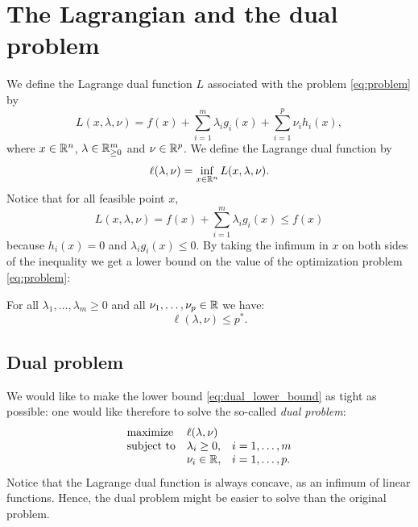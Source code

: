 \documentclass[11pt,nocut]{article}
\begin{document}
\section{The Lagrangian and the dual problem}

We define the Lagrange dual function $L$ associated with the problem \eqref{eq:problem} by
\begin{equation}
	L(x,\lambda,\nu) = 
	f(x) + \sum_{i=1}^m \lambda_i g_i(x) + \sum_{i=1}^p \nu_i h_i(x),
\end{equation}
where $x \in \mathbb{R}^n$, $\lambda \in \mathbb{R}_{\geq 0}^m$ and $\nu \in \mathbb{R}^p$. We define the Lagrange dual function by
$$
\ell(\lambda,\nu) = \inf_{x \in \mathbb{R}^n} L(x,\lambda,\nu).
$$
Notice that for all feasible point $x$,
$$
L(x,\lambda,\nu)
= f(x) + \sum_{i=1}^m \lambda_i g_i(x) \leq f(x)
$$
because $h_i(x) = 0$ and $\lambda_i g_i(x) \leq 0$. By taking the infimum in $x$ on both sides of the inequality we get a lower bound on the value of the optimization problem \eqref{eq:problem}:
\begin{proposition}
	For all $\lambda_1, \dots, \lambda_m \geq 0$ and all $\nu_1, \dots,\nu_p \in \mathbb{R}$ we have:
	\begin{equation}\label{eq:dual_lower_bound}
		\ell(\lambda,\nu) \leq p^*.
	\end{equation}
\end{proposition}

\subsection{Dual problem}

We would like to make the lower bound \eqref{eq:dual_lower_bound} as tight as possible: one would like therefore to solve the so-called \emph{dual problem}:
\begin{equation}\label{eq:dual_problem}
	\begin{array}{lll}
		\text{maximize} & \ell(\lambda,\nu) & \\
		\text{subject to} & \lambda_i \geq 0, & i=1, \dots, m \\
						  & \nu_i \in \mathbb{R}, & i=1, \dots, p.
	\end{array}
\end{equation}
Notice that the Lagrange dual function is always concave, as an infimum of linear functions. Hence, the dual problem might be easier to solve than the original problem.
\\
\end{document}
